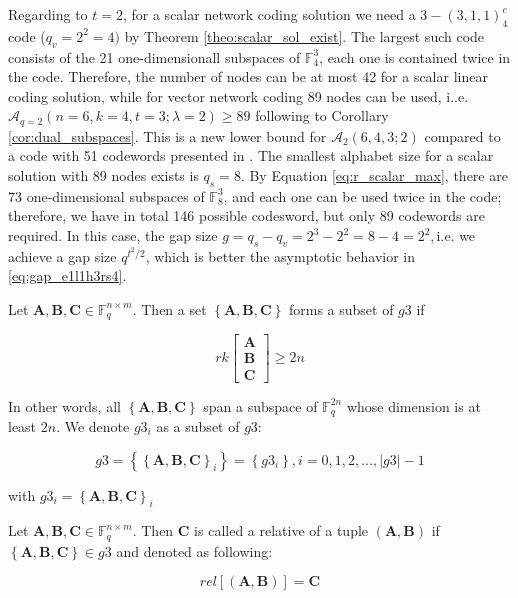 Regarding to $t=2$, for a scalar network coding solution we need
a $3-\left(3,1,1\right)_{4}^{c}$ code ($q_{v}=2^{2}=4)$ by Theorem
\ref{theo:scalar_sol_exist}. The largest such code consists of the
21 one-dimensionall subspaces of $\ensuremath{\mathbb{F}}_{4}^{3}$,
each one is contained twice in the code. Therefore, the number of
nodes can be at most 42 for a scalar linear coding solution, while
for vector network coding 89 nodes can be used, i..e. $\mathcal{A}_{q=2}\left(n=6,k=4,t=3;\lambda=2\right)\geq89$
following to Corollary \ref{cor:dual_subspaces}. This is a new lower
bound for $\mathcal{A}_{2}\left(6,4,3;2\right)$ compared to a code
with 51 codewords presented in \cite{Wachter-Zeh:2018}. The smallest
alphabet size for a scalar solution with 89 nodes exists is $q_{s}=8$.
By Equation \ref{eq:r_scalar_max}, there are 73 one-dimensional subspaces
of $\ensuremath{\mathbb{F}}_{8}^{3}$, and each one can be used twice
in the code; therefore, we have in total 146 possible codesword, but
only 89 codewords are required. In this case, the gap size $g=q_{s}-q_{v}=2^{3}-2^{2}=8-4=2^{2},$i.e.
we achieve a gap size $q^{t^{2}/2}$, which is better the asymptotic
behavior in \ref{eq:gap_e1l1h3rs4}.
\begin{defn}[G3]
 Let $\boldsymbol{A},\boldsymbol{B},\boldsymbol{C}\in\ensuremath{\mathbb{F}}_{q}^{n\times m}$.
Then a set $\left\{ \boldsymbol{A},\boldsymbol{B},\boldsymbol{C}\right\} $
forms a subset of $g3$ if

\[
rk\left[\begin{array}{c}
\boldsymbol{A}\\
\boldsymbol{B}\\
\boldsymbol{C}
\end{array}\right]\geq2n
\]

In other words, all $\left\{ \boldsymbol{A},\boldsymbol{B},\boldsymbol{C}\right\} $
span a subspace of $\ensuremath{\mathbb{F}}_{q}^{2n}$ whose dimension
is at least $2n$. We denote $g3_{i}$ as a subset of $g3$:

\[
g3=\left\{ \left\{ \boldsymbol{A},\boldsymbol{B},\boldsymbol{C}\right\} _{i}\right\} =\left\{ g3_{i}\right\} ,i=0,1,2,...,\left|g3\right|-1
\]

with $g3_{i}=\left\{ \boldsymbol{A},\boldsymbol{B},\boldsymbol{C}\right\} _{i}$
\end{defn}
%
\begin{defn}[Relative]
 Let $\boldsymbol{A},\boldsymbol{B},\boldsymbol{C}\in\ensuremath{\mathbb{F}}_{q}^{n\times m}$.
Then $\boldsymbol{C}$ is called a relative of a tuple $\left(\boldsymbol{A},\boldsymbol{B}\right)$
if $\left\{ \boldsymbol{A},\boldsymbol{B},\boldsymbol{C}\right\} \in g3$
and denoted as following:

\[
rel\left[\left(\boldsymbol{A},\boldsymbol{B}\right)\right]=\boldsymbol{C}
\]
\end{defn}
